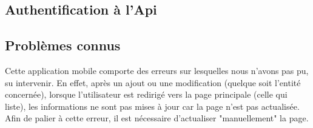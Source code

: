
		\subsection{Authentification à l'Api}


		\subsection{Problèmes connus}

			Cette application mobile comporte des erreurs sur lesquelles nous n'avons pas pu, su intervenir. En effet, après un ajout ou une modification (quelque soit l'entité concernée), lorsque l'utilisateur est redirigé vers la page principale (celle qui liste), les informations ne sont pas mises à jour car la page n'est pas actualisée. \newline
			Afin de palier à cette erreur, il est nécessaire d'actualiser "manuellement" la page.

